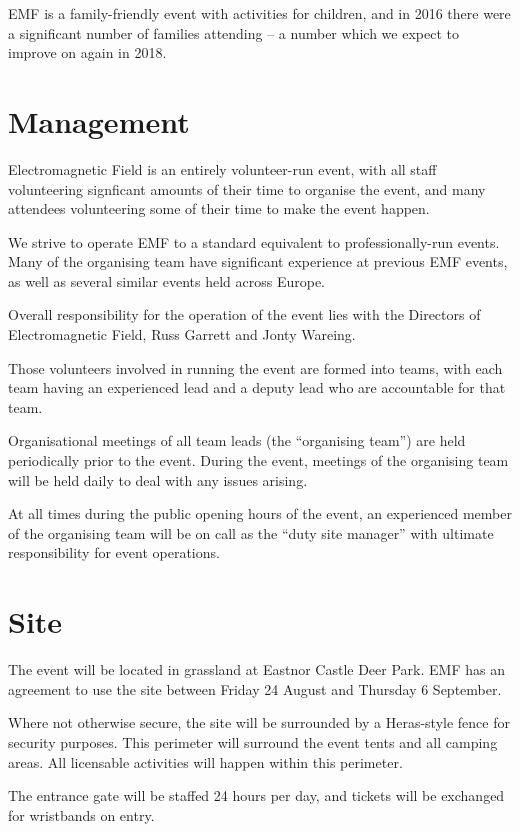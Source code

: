 EMF is a family-friendly event with activities for children, and in 2016 there
were a significant number of families attending -- a number which we expect to
improve on again in 2018.

\section{Management}

Electromagnetic Field is an entirely volunteer-run event, with all staff
volunteering signficant amounts of their time to organise the event, and many
attendees volunteering some of their time to make the event happen.

We strive to operate EMF to a standard equivalent to professionally-run events.
Many of the organising team have significant experience at previous EMF events,
as well as several similar events held across Europe.

Overall responsibility for the operation of the event lies with the Directors
of Electromagnetic Field, Russ Garrett and Jonty Wareing.

Those volunteers involved in running the event are formed into teams, with each
team having an experienced lead and a deputy lead who are accountable for that
team.

Organisational meetings of all team leads (the ``organising team'') are held
periodically prior to the event.  During the event, meetings of the organising
team will be held daily to deal with any issues arising.

At all times during the public opening hours of the event, an experienced member
of the organising team will be on call as the ``duty site manager'' with
ultimate responsibility for event operations.

\section{Site}

The event will be located in grassland at Eastnor Castle Deer Park. EMF has an
agreement to use the site between Friday 24 August and Thursday
6 September.

Where not otherwise secure, the site will be surrounded by a Heras-style fence
for security purposes.  This perimeter will surround the event tents and all
camping areas. All licensable activities will happen within this perimeter.

The entrance gate will be staffed 24 hours per day, and tickets will be
exchanged for wristbands on entry.

